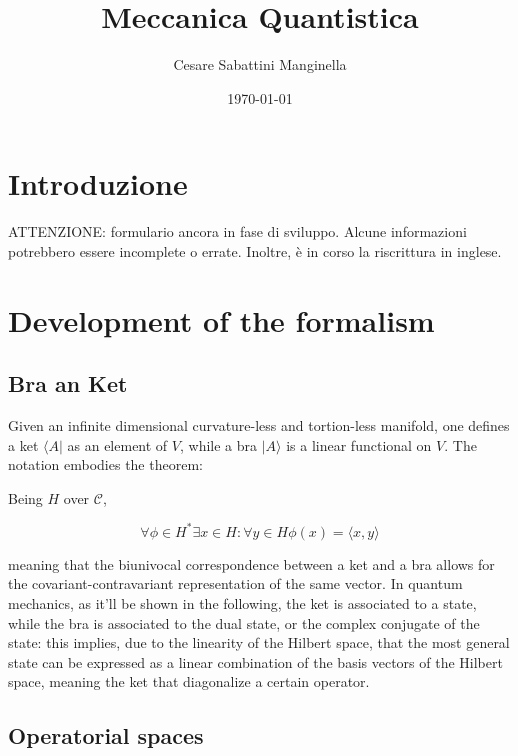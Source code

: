 \documentclass{article}
\title{Meccanica Quantistica}
\author{Cesare Sabattini Manginella}
\date{\today}
\begin{document}
\maketitle

\tableofcontents
\newpage

\section{Introduzione}
ATTENZIONE: formulario ancora in fase di sviluppo. Alcune informazioni potrebbero essere incomplete o errate.
Inoltre, è in corso la riscrittura in inglese.

\section{Development of the formalism}

\subsection{Bra an Ket}

Given an infinite dimensional curvature-less and tortion-less manifold, one defines a ket $\langle A|$ as an element of $V$, while a bra $|A\rangle $ is a linear functional on $V$.
The notation embodies the theorem:

\begin{tcolorbox}[colframe=gray!50, colback=gray!10, coltitle=black, title=Fisher Reisz Representation Theorem]
  Being  $H$ over $\mathcal{C}$,

  \begin{equation}
    \forall \phi \in H^* \exists x \in H : \forall y \in H \phi(x)=\langle x,y\rangle
  \end{equation}
\end{tcolorbox}

meaning that the biunivocal correspondence between a ket and a bra allows for the covariant-contravariant representation of the same vector.
In quantum mechanics, as it'll be shown in the following, the ket is associated to a state, while the bra is associated to the dual state, or the complex conjugate of the state:
this implies, due to the linearity of the Hilbert space, that the most general state can be expressed as a linear combination of the basis vectors of the Hilbert space, meaning
the ket that diagonalize a certain operator.

\subsection{Operatorial spaces}
\end{document}
